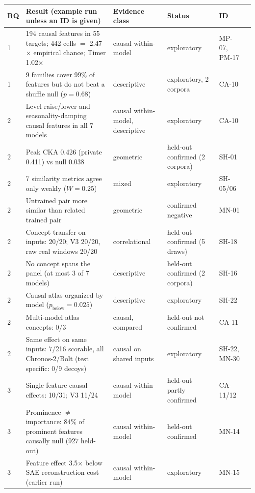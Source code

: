 \begin{table}[tb]
\centering
\footnotesize
\setlength{\tabcolsep}{3pt}
\scriptsize
\begin{tabularx}{\textwidth}{@{}l>{\raggedright}Xllll@{}}
\toprule
RQ & Result (example run unless an ID is given) & Evidence class & Status & ID \\
\midrule
1 & 194 causal features in 55 targets; 442 cells $=$ 2.47$\times$ empirical chance; Timer 1.02$\times$ & causal within-model & exploratory & MP-07, PM-17 \\
1 & 9 families cover 99\% of features but do not beat a shuffle null ($p=0.68$) & descriptive & exploratory, 2 corpora & CA-10 \\
2 & Level raise/lower and seasonality-damping causal features in all 7 models & causal within-model, descriptive & exploratory & CA-10 \\
2 & Peak CKA 0.426 (private 0.411) vs null 0.038 & geometric & held-out confirmed (2 corpora) & SH-01 \\
2 & 7 similarity metrics agree only weakly ($W=0.25$) & mixed & exploratory & SH-05/06 \\
2 & Untrained pair more similar than related trained pair & geometric & confirmed negative & MN-01 \\
2 & Concept transfer on inputs: 20/20; V3 20/20, raw real windows 20/20 & correlational & held-out confirmed (5 draws) & SH-18 \\
2 & No concept spans the panel (at most 3 of 7 models) & descriptive & held-out confirmed (2 corpora) & SH-16 \\
2 & Causal atlas organized by model ($p_{\text{below}}=0.025$) & descriptive & exploratory & SH-22 \\
2 & Multi-model atlas concepts: 0/3 & causal, compared & held-out not confirmed & CA-11 \\
2 & Same effect on same inputs: 7/216 scorable, all Chronos-2/Bolt (test specific: 0/9 decoys) & causal on shared inputs & exploratory & SH-22, MN-30 \\
3 & Single-feature causal effects: 10/31; V3 11/24 & causal within-model & held-out partly confirmed & CA-11/12 \\
3 & Prominence $\neq$ importance: 84\% of prominent features causally null (927 held-out) & causal within-model & held-out confirmed & MN-14 \\
3 & Feature effect 3.5$\times$ below SAE reconstruction cost (earlier run) & causal within-model & exploratory & MN-15 \\

\end{tabularx}
\end{table}
